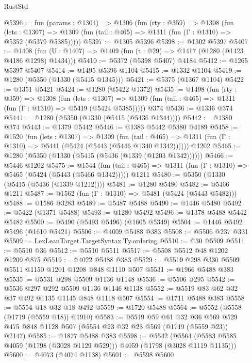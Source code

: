 \begin{lexlean}{RustStd}
\begin{coremodule}
{\begin{coremodule}
{{{{{{{{{{{{@5396 := fun (params : @1304) =>
  @1306
    (fun (rty : @359) =>
    @1308
      (fun (lets : @1307) =>
      @1309 (fun (tail : @465) => @1311 (fun (Γ : @1310) => @5352 (@5379 @5385)))))
@5397 := @1305 @5396
@5398 := @1302 @5397
@5407 := @1408 (fun (U : @1407) => @1409 (fun (t : @29) => @1417 (@1280 (@1423 @4186 @1298) @1434)))
@5410 := @5372 (@5398 @5407) @4184
@5412 := @1265 @5397 @5407
@5414 := @1495 @5396 @1104
@5415 := @1332 @1104
@5419 := @1280 (@5350 (@1330 (@5415 @1345)))
@5421 := @5375 (@1367 @1104)
@5422 := @1351 @5421
@5424 := @1280 (@5422 @1372)
@5435 := @1498
    (fun (rty : @359) =>
    @1308
      (fun (lets : @1307) =>
      @1309 (fun (tail : @465) => @1311 (fun (Γ : @1310) => @5419 (@5424 @5385)))))
    @374
@5436 := @1336 @374
@5441 := @1280 (@5350 (@1330 (@5415 (@5436 @1344))))
@5442 := @1380 @374
@5443 := @1379 @5442
@5446 := @1383 @5442 @5380 @4189
@5458 := @1520
    (fun (lets : @1307) =>
    @1309
      (fun (tail : @465) => @1311 (fun (Γ : @1310) => @5441 (@5424 (@5443 (@5446 @1340 @1342))))))
    @1202
@5465 := @1280 (@5350 (@1330 (@5415 (@5436 (@1339 (@1203 @1342))))))
@5466 := @5446 @1202
@5475 := @1544
    (fun (tail : @465) => @1311 (fun (Γ : @1310) => @5465 (@5424 (@5443 (@5466 @1342)))))
    @1211
@5480 := @5350 (@1330 (@5415 (@5436 (@1339 @1212))))
@5481 := @1280 @5480
@5482 := @5466 @1211
@5487 := @1562 (fun (Γ : @1310) => @5481 (@5424 (@5443 @5482)))
@5488 := @1586 @3283
@5489 := @5487 @5488
@5490 := @1446 @5480
@5492 := @5422 (@1371 @5488)
@5493 := @1280 @5492
@5496 := @1378 @5488 @5442 @5482
@5500 := @5490 (@5493 @5496) (@1605 @5349)
@5504 := @1446 @5492 @5496 (@1610 @5421)
@5506 := @4009 @5488 @383
@5508 := @5506 @237 @331
@5509 := LexLeanTarget.TargetSyntax.Ty.ordering
@5510 := @30 @5509
@5511 := @5510 @36
@5512 := @5510 @5511
@5517 := @5508 @5512 @48 @1202 @1209 @875
@5519 := @4022 @5488 @383
@5529 := @5519 @298 @330 @5509 @5511 @1150 @1201 @1208 @848 @1110 @507
@5531 := @1966 @5488 @383
@5535 := @5531 @298 @5509 @1136 @1148
@5536 := @5506 @295
@5542 := @5536 @297 @292 @5509 @1136 @1146 @1138
@5552 := @5519 @83 @62 @32 @37 @492 @1135 @1145 @848 @1118 @507
@5554 := @1711 @5488 @383
@5558 := @5554 @18 @32 @18 @492
@5559 := @1720 @5488
@5564 := @5552 (@5558 (@1719 (@5559 @18)) @1910)
@5583 := @5519
    @59
    @61
    @32
    @36
    @569
    @529
    @475
    @848
    @1128
    @507
    (@5554 @23 @32 @23 @569 (@1719 (@5559 @23)) @2147)
@5585 := @1877 @5488 @383
@5598 := @5542
    (@5564 (@5583 @5585 @4059 (@1798 (@3028 @1129 @529))) @4059 (@1798 (@3028 @1119 @1135)))
@5600 := @4073 (@4074 @1138)
@5601 := @5598 @5600
}}}}}}}}}}}}
\end{coremodule}}
\end{coremodule}
\end{lexlean}
